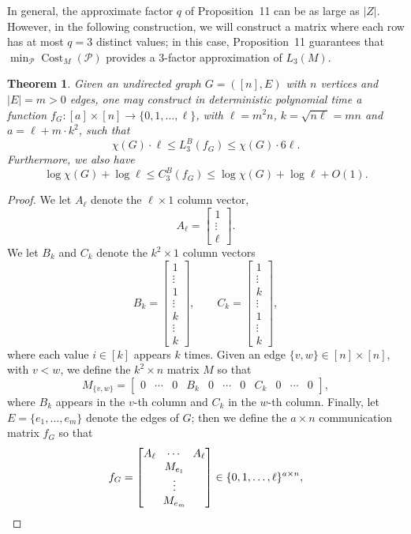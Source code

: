 \documentclass[10pt,a4paper]{article}
\newtheorem{theorem}{Theorem}
\begin{document}
In general, the approximate factor $q$ of Proposition~11 can be as large as $|Z|$. However, in the following construction, we will construct a matrix where each row has at most $q=3$ distinct values; in this case, Proposition~11 guarantees that $\min_{\mathcal P}\operatorname{Cost}_M(\mathcal P)$ provides a 3-factor approximation of $L_3(M)$.
\begin{theorem}
Given an undirected graph $G=([n],E)$ with $n$ vertices and $|E|=m>0$ edges, one may construct in deterministic polynomial time a function $f_G:[a]\times[n]\to\{0,1,\ldots,\ell\}$, with $\ell=m^2n$, $k=\sqrt{n\ell}=mn$ and $a=\ell+m\cdot k^2$, such that
\[\chi(G)\cdot\ell\le L_3^B(f_G)\le\chi(G)\cdot6\ell.\]
Furthermore, we also have
\[\log\chi(G)+\log\ell\le C_3^B(f_G)\le\log\chi(G)+\log\ell+O(1).\]
\end{theorem}
\begin{proof}
We let $A_\ell$ denote the $\ell\times1$ column vector,
\[A_\ell=\begin{bmatrix}1\\\vdots\\\ell\end{bmatrix}.\]
We let $B_k$ and $C_k$ denote the $k^2\times1$ column vectors
\[B_k=\begin{bmatrix}1\\\vdots\\1\\\vdots\\k\\\vdots\\k\end{bmatrix},\qquad C_k=\begin{bmatrix}1\\\vdots\\k\\\vdots\\1\\\vdots\\k\end{bmatrix},\]
where each value $i\in[k]$ appears $k$ times. Given an edge $\{v,w\}\in[n]\times[n]$, with $v<w$, we define the $k^2\times n$ matrix $M$ so that
\[M_{\{v,w\}}=\begin{bmatrix}0&\cdots&0&B_k&0&\cdots&0&C_k&0&\cdots&0\end{bmatrix},\]
where $B_k$ appears in the $v$-th column and $C_k$ in the $w$-th column. Finally, let $E=\{e_1,\ldots,e_m\}$ denote the edges of $G$; then we define the $a\times n$ communication matrix $f_G$ so that
\[f_G=\begin{bmatrix}A_\ell&\cdots&A_\ell\\\multicolumn{3}{c}{M_{e_1}}\\\multicolumn{3}{c}{\vdots}\\\multicolumn{3}{c}{M_{e_m}}\end{bmatrix}\in\{0,1,\ldots,\ell\}^{a\times n},\]

\end{proof}
\end{document}
